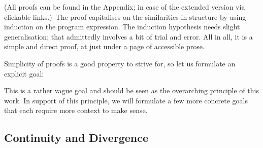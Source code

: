 (All proofs can be found in the Appendix; in case of the extended version via
clickable links.)\,
The proof capitalises on the similarities in structure by using
induction on the program expression.
The induction hypothesis needs slight generalisation; that admittedly
involves a bit of trial and error.
All in all, it is a simple and direct proof, at just under a page of accessible
prose.

Simplicity of proofs is a good property to strive for, so let us formulate an
explicit goal:



This is a rather vague goal and should be seen as the overarching principle of
this work.
In support of this principle, we will formulate a few more concrete goals that
each require more context to make sense.


\subsection{Continuity and Divergence}
\label{sec:continuity}

